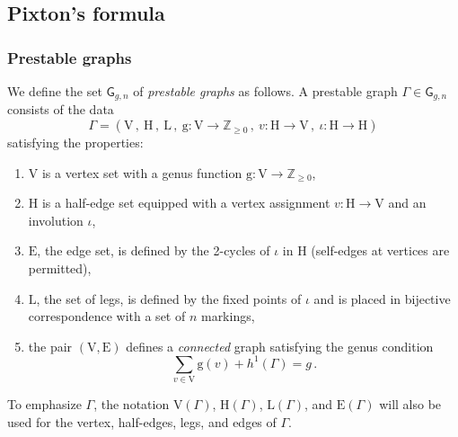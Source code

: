 \documentclass[a4paper,12pt]{article} %
\def\cM{{\mathcal{M}}}
\def\Z{\mathbb{Z}}
\def\E{\mathrm{E}}
\def\n{\mathrm{n}}
\def\L{\mathrm{L}}
\def\V{\mathrm{V}}
\def\H{\mathrm{H}}
\def\g{\mathrm{g}}
\def\G{\mathsf{G}}
\def\rarr{\rightarrow}
\def\nice{\displaystyle}
\theoremstyle{definition}
\theoremstyle{plain}%
\newtheorem*{theorem*}{Theorem}
\newcommand{\Picabs}{\mathfrak{Pic}}
\newcommand{\jocomment}[1]{}
\begin{document}



\subsection{Pixton's formula}

\subsubsection{Prestable graphs}\label{xvalsg}
We define the set $\G_{g,n}$ of {\em prestable graphs} as
follows. A prestable graph $\Gamma \in \G_{g,n}$ consists of the data
$$\Gamma=(\V\, ,\ \H\, ,\ \L\, , \ \mathrm{g}:\V \rarr \Z_{\geq 0}\, ,
\ v:\H\rarr \V\, , 
\ \iota : \H\rarr \H)$$
satisfying the properties:
\begin{enumerate}
\item[(i)] $\V$ is a vertex set with a genus function $\g:\V\to \Z_{\geq 0}$,
\item[(ii)] $\H$ is a half-edge set equipped with a 
vertex assignment $v:\H \to \V$ and an involution $\iota$,
\item[(iii)] $\E$, the edge set, is defined by the
2-cycles of $\iota$ in $\H$ (self-edges at vertices
are permitted),
\item[(iv)] $\L$, the set of legs, is defined by the fixed points of $\iota$ and is
placed in bijective correspondence with a set of $n$ markings,
\item[(v)] the pair $(\V,\E)$ defines a {\em connected} graph
satisfying the genus condition 
$$\nice \sum_{v \in \V} \g(v) + h^1(\Gamma) = g\, .$$
\end{enumerate}
To emphasize $\Gamma$, the notation $\V(\Gamma)$, $\H(\Gamma)$, $\L(\Gamma)$, and $\E(\Gamma)$ will also be used for the vertex, half-edges, legs, and
edges of $\Gamma$. 
\end{document}
